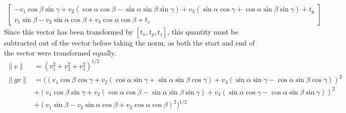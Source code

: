 \documentclass[12pt]{article}
\begin{document}
\begin{enumerate}
\begin{enumerate}
\begin{align*}
\begin{bmatrix}
		- v_1 \cos\beta \sin\gamma + v_2 (\cos\alpha \cos\beta - \sin\alpha \sin\beta \sin\gamma) + v_3 ( \sin\alpha \cos\gamma + \cos\alpha \sin\beta \sin\gamma) + t_y \\
		v_1\sin\beta - v_2\sin\alpha \cos\beta + v_3 \cos\alpha\cos\beta + t_z
		\end{bmatrix}
		\end{align*}
		Since this vector has been transformed by $[t_x, t_y, t_z]$, this quantity must be subtracted out of the vector before taking the norm, as both the start and end of the vector were transformed equally.
		\begin{align*}
		\| v \| &= (v_1^2 + v_2^2 + v_3^2)^{1/2} \\
		\| gv \| &= \big(\left(v_1\cos\beta\cos\gamma + v_2 (\cos\alpha \sin\gamma + \sin\alpha \sin\beta \cos\gamma)  + v_3 (\sin\alpha \sin\gamma - \cos\alpha \sin\beta \cos\gamma)\right)^2 \\ & + \left(v_1 \cos\beta \sin\gamma + v_2 (\cos\alpha \cos\beta - \sin\alpha \sin\beta \sin\gamma) + v_3 ( \sin\alpha \cos\gamma - \cos\alpha \sin\beta \sin\gamma)\right)^2 \\ &+ \left(v_1\sin\beta - v_2\sin\alpha \cos\beta + v_3 \cos\alpha\cos\beta\right)^2\big)^{1/2}
		\end{align*}
		

\end{enumerate}
\end{enumerate}
\end{document}
